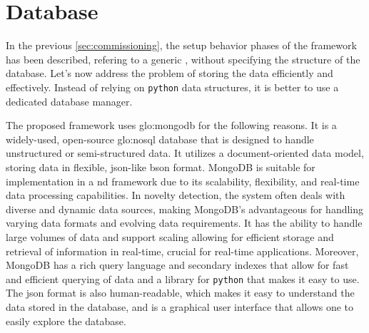 
\section{Database}
\label{sec:Database}
In the previous \autoref{sec:commissioning}, the setup behavior phases of the framework has been described, refering to a generic , without specifying the structure of the database. Let's now address the problem of storing the data efficiently and effectively. Instead of relying on \texttt{python} data structures, it is better to use a dedicated database manager. 

The proposed framework uses \gls{glo:mongodb} for the following reasons. It is a widely-used, open-source \gls{glo:nosql} database that is designed to handle unstructured or semi-structured data. It utilizes a document-oriented data model, storing data in flexible, \gls{json}-like \gls{bson} format. MongoDB is suitable for implementation in a \gls{nd} framework due to its scalability, flexibility, and real-time data processing capabilities. In novelty detection, the system often deals with diverse and dynamic data sources, making MongoDB's  advantageous for handling varying data formats and evolving data requirements. It has the ability to handle large volumes of data and support scaling allowing for efficient storage and retrieval of information in real-time, crucial for real-time applications. Moreover, MongoDB has a rich query language and secondary indexes that allow for fast and efficient querying of data and a library for \texttt{python} that makes it easy to use.
The \gls{json} format is also human-readable, which makes it easy to understand the data stored in the database, and  is a graphical user interface that allows one to easily explore the database.

